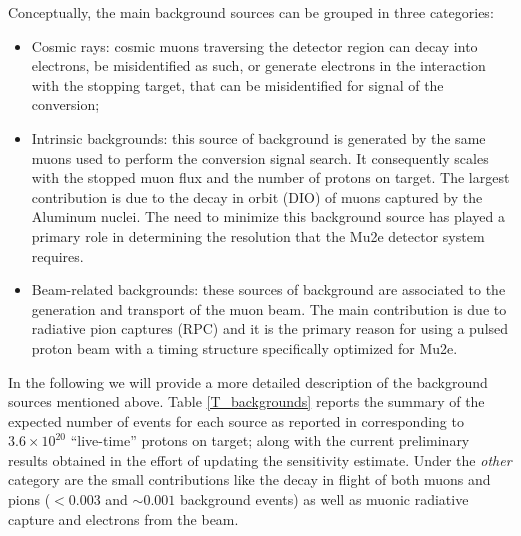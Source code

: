 \documentclass[12pt,a4paper,openright, oneside, titlepage]{book} %
\begin{document}
\noindent Conceptually, the main background sources can be grouped in three categories: 

\begin{itemize}
\item Cosmic rays: cosmic muons traversing the detector region can decay into electrons, be misidentified as such, or generate electrons in the interaction with the stopping target, that can be misidentified for signal of the conversion; 
\item Intrinsic backgrounds: this source of background is generated by the same muons used to perform the conversion signal search.
It consequently scales with the stopped muon flux and the number of protons on target. 
The largest contribution is due to the decay in orbit (DIO) of muons captured by the Aluminum nuclei. 
The need to minimize this background source has played a primary role in determining the resolution that the Mu2e detector system requires.
\item Beam-related backgrounds: these sources of background are associated to the generation and transport of the muon beam. 
The main contribution is due to radiative pion captures (RPC) and it is the primary reason for using a pulsed proton beam with a timing structure specifically optimized  for Mu2e. 
\end{itemize}
In the following we will provide a more detailed description of the background sources mentioned above.
Table \ref{T_backgrounds} reports the summary of the expected number of events for each source as reported in \cite{CD3} corresponding to $3.6 \times 10^{20}$ ``live-time'' protons on target; along with the current preliminary results obtained in the effort of updating the sensitivity estimate. 
Under the \textit{other} category are the small contributions like the decay in flight of both muons and pions ($<0.003$ and $\sim 0.001$ background events) as well as muonic radiative capture and electrons from the beam.
\end{document}
